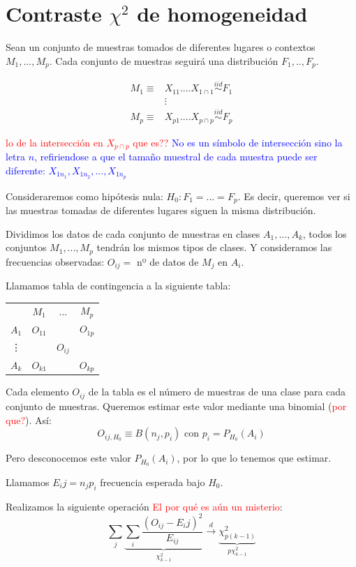 \documentclass[nochap]{apuntes}
\begin{document}
\section{Contraste $\chi^2$ de homogeneidad}
Sean un conjunto de muestras tomados de diferentes lugares o contextos $M_1,...,M_p$. Cada conjunto de muestras seguirá una distribución $F_1,..,F_p$.

\begin{align*}
M_1 \equiv & X_{11} .... X_{1\cap 1} \stackrel{iid}{\sim} F_1 \\
& \vdots \\
M_p \equiv & X_{p1} .... X_{p\cap p} \stackrel{iid}{\sim} F_p
\end{align*}

\textcolor{red}{lo de la intersección en $X_{p\cap p}$ que es??}
\textcolor{blue}{No es un símbolo de intersección sino la letra $n$, refiriendose a que el tamaño muestral de cada muestra puede ser diferente: $X_{1n_1},X_{1n_2},...,X_{1n_p}$}

Consideraremos como hipótesis nula: $H_0: F_1=...=F_p$. Es decir, queremos ver si las muestras tomadas de diferentes lugares siguen la misma distribución.

Dividimos los datos de cada conjunto de muestras en clases $A_1,...,A_k$, todos los conjuntos $M_1,...,M_p$ tendrán los mismos tipos de clases. Y consideramos las frecuencias observadas: $O_{ij}=$ nº de datos de $M_j$ en $A_i$.

Llamamos tabla de contingencia a la siguiente tabla:

\begin{tabular}{cccc}
& $M_1$ & ... & $M_p$ \\
$A_1$ & $O_{11}$ &  & $O_{1p}$ \\
\vdots &  & $O_{ij}$ &  \\
$A_k$ & $O_{k1}$ &  & $O_{kp}$ \\
\end{tabular}

Cada elemento $O_{ij}$ de la tabla es el número de muestras de una clase para cada conjunto de muestras. Queremos estimar este valor mediante una binomial (\textcolor{red}{por que?}). Así:
$$ O_{ij,H_0} \equiv B(n_j, p_i)  \text{ con } p_i=P_{H_0}(A_i)$$

Pero desconocemos este valor $P_{H_0}(A_i)$, por lo que lo tenemos que estimar.

Llamamos $E_ij =n_j p_i$ frecuencia esperada bajo $H_0$.

Realizamos la siguiente operación \textcolor{red}{El por qué es aún un misterio}:
$$ \sum_j \underbrace{\sum_i \frac{(O_{ij}-E_ij)^2}{E_{ij}}}_{\chi^2_{k-1}} \stackrel{d}{\rightarrow} \underbrace{\chi^2_{p(k-1)}}_{p\chi^2_{k-1}} $$
\end{document}
